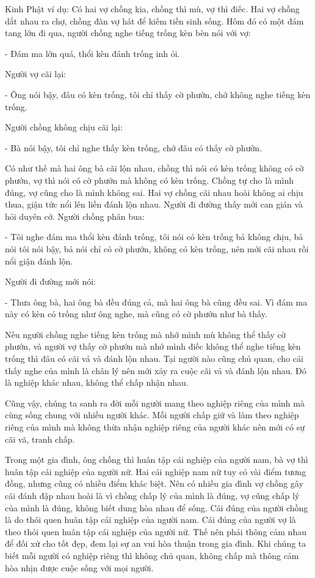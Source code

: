 \documentclass[
  12pt,
  oneside]{book}
\begin{document}
Kinh Phật ví dụ: Có hai vợ chồng kia, chồng thì mù, vợ thì điếc. Hai vợ chồng dắt nhau ra chợ, chồng đàn vợ hát để kiếm tiền sinh sống. Hôm đó có một đám tang lớn đi qua, người chồng nghe tiếng trống kèn bèn nói với vợ:

- Đám ma lớn quá, thổi kèn đánh trống inh ỏi.

Người vợ cãi lại:

- Ông nói bậy, đâu có kèn trống, tôi chỉ thấy cờ phướn, chớ không nghe tiếng kèn trống.

Người chồng không chịu cãi lại:

- Bà nói bậy, tôi chỉ nghe thấy kèn trống, chớ đâu có thấy cờ phướn.

Có như thế mà hai ông bà cãi lộn nhau, chồng thì nói có kèn trống không có cờ phướn, vợ thì nói có cờ phướn mà không có kèn trống. Chồng tự cho là mình đúng, vợ cũng cho là mình không sai. Hai vợ chồng cãi nhau hoài không ai chịu thua, giận tức nổi lên liền đánh lộn nhau. Người đi đường thấy mới can gián và hỏi duyên cớ. Người chồng phân bua:

- Tôi nghe đám ma thổi kèn đánh trống, tôi nói có kèn trống bả không chịu, bả nói tôi nói bậy, bả nói chỉ có cờ phướn, không có kèn trống, nên mới cãi nhau rồi nổi giận đánh lộn.

Người đi đường mới nói:

- Thưa ông bà, hai ông bà đều đúng cả, mà hai ông bà cũng đều sai. Vì đám ma này có kèn có trống như ông nghe, mà cũng có cờ phướn như bà thấy.

Nếu người chồng nghe tiếng kèn trống mà nhớ mình mù không thể thấy cờ phướn, và người vợ thấy cờ phướn mà nhớ mình điếc không thể nghe tiếng kèn trống thì đâu có cãi vả và đánh lộn nhau. Tại người nào cũng chủ quan, cho cái thấy nghe của mình là chân lý nên mới xảy ra cuộc cãi vả và đánh lộn nhau. Đó là nghiệp khác nhau, không thể chấp nhận nhau.

Cũng vậy, chúng ta sanh ra đời mỗi người mang theo nghiệp riêng của mình mà cùng sống chung với nhiều người khác. Mỗi người chấp giữ và làm theo nghiệp riêng của mình mà không thừa nhận nghiệp riêng của người khác nên mới có sự cãi vã, tranh chấp.

Trong một gia đình, ông chồng thì huân tập cái nghiệp của người nam, bà vợ thì huân tập cái nghiệp của người nữ. Hai cái nghiệp nam nữ tuy có vài điểm tương đồng, nhưng cũng có nhiều điểm khác biệt. Nên có nhiều gia đình vợ chồng gây cãi đánh đập nhau hoài là vì chồng chấp lý của mình là đúng, vợ cũng chấp lý của mình là đúng, không biết dung hòa nhau để sống. Cái đúng của người chồng là do thói quen huân tập cái nghiệp của người nam. Cái đúng của người vợ là theo thói quen huân tập cái nghiệp của người nữ. Thế nên phải thông cảm nhau để đối xử cho tốt đẹp, đem lại sự an vui hòa thuận trong gia đình. Khi chúng ta biết mỗi người có nghiệp riêng thì không chủ quan, không chấp mà thông cảm hòa nhịn được cuộc sống với mọi người.
\end{document}
